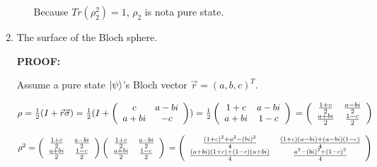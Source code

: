 \documentclass{article}
\begin{document}
\begin{enumerate}
\begin{enumerate}
                    Because $Tr(\rho_2^2)=1$, $\rho_2$ is nota pure state.
          \end{enumerate}
    \item The surface of the Bloch sphere.

          \textbf{PROOF:}

          Assume a pure state $\ket{\psi}$'s Bloch vector $\vec{r}=(a,b,c)^T$.

          $\rho=\frac{1}{2}(I+\vec{r}\vec{\sigma})
              \\=\frac{1}{2}(I+\left(
              \begin{array}{cc}
                      c & a-bi \\a+bi&-c\\
                  \end{array}
              \right))
              \\=\frac{1}{2}\left(
              \begin{array}{cc}
                      1+c & a-bi \\a+bi&1-c\\
                  \end{array}
              \right)
              \\=\left(
              \begin{array}{cc}
                      \frac{1+c}{2} & \frac{a-bi}{2} \\\frac{a+bi}{2}&\frac{1-c}{2}\\
                  \end{array}
              \right)
          $

          $\rho^2=\left(
              \begin{array}{cc}
                      \frac{1+c}{2} & \frac{a-bi}{2} \\\frac{a+bi}{2}&\frac{1-c}{2}\\
                  \end{array}
              \right)\left(
              \begin{array}{cc}
                      \frac{1+c}{2} & \frac{a-bi}{2} \\\frac{a+bi}{2}&\frac{1-c}{2}\\
                  \end{array}
              \right)
              \\=\left(
              \begin{array}{cc}
                      \frac{(1+c)^2+a^2-(bi)^2}{4} & \frac{(1+c)(a-bi)+(a-bi)(1-c)}{4} \\\frac{(a+bi)(1+c)+(1-c)(a+bi)}{4}&\frac{a^2-(bi)^2+(1-c)^2}{4}\\
                  \end{array}
              \right)
          $


\end{enumerate}
\end{document}
